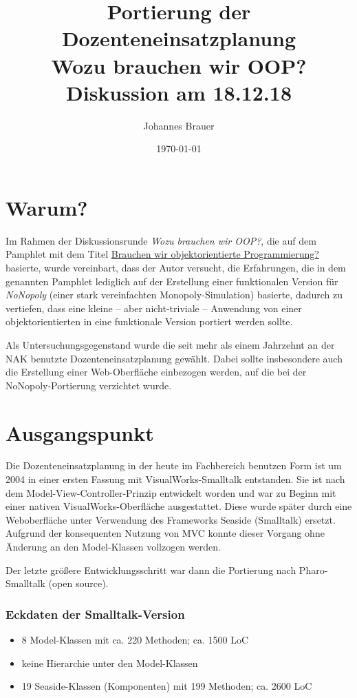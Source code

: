 \documentclass[11pt]{article}
\author{Johannes Brauer}
\date{\today}
\title{Portierung der Dozenteneinsatzplanung\\\medskip
\large Wozu brauchen wir OOP? Diskussion am 18.12.18}
\begin{document}
\maketitle
\section*{Warum?}
\label{sec:org979a519}
Im Rahmen der Diskussionsrunde \emph{Wozu brauchen wir OOP?}, die auf dem
Pamphlet mit dem Titel \href{https://www.dropbox.com/s/36vsbdk1bn4w17o/oop-wozu.pdf?dl=0}{Brauchen wir objektorientierte Programmierung?}
basierte, wurde vereinbart, dass der Autor versucht, die Erfahrungen, die in
dem genannten Pamphlet lediglich auf der Erstellung einer funktionalen
Version für \emph{NoNopoly} (einer stark vereinfachten Monopoly-Simulation)
basierte, dadurch zu vertiefen, dass eine kleine -- aber
nicht-triviale -- Anwendung von einer objektorientierten in
eine funktionale Version portiert werden sollte.

Als Untersuchungsgegenstand wurde die seit mehr als einem Jahrzehnt an
der NAK benutzte Dozenteneinsatzplanung gewählt. Dabei sollte
insbesondere auch die Erstellung einer Web-Oberfläche einbezogen
werden, auf die bei der NoNopoly-Portierung verzichtet wurde.
\section*{Ausgangspunkt}
\label{sec:orge7ee835}
Die Dozenteneinsatzplanung in der heute im Fachbereich benutzen Form
ist um 2004 in einer ersten Fassung mit VisualWorks-Smalltalk
entstanden. Sie ist nach dem Model-View-Controller-Prinzip entwickelt
worden und war zu Beginn mit einer nativen VisualWorks-Oberfläche
ausgestattet. Diese wurde später durch eine Weboberfläche unter
Verwendung des Frameworks Seaside (Smalltalk) ersetzt. Aufgrund
der konsequenten Nutzung von MVC konnte dieser Vorgang ohne Änderung
an den Model-Klassen vollzogen werden.

Der letzte größere Entwicklungsschritt war dann die Portierung nach
Pharo-Smalltalk (open source).
\subsubsection*{Eckdaten der Smalltalk-Version}
\label{sec:orgb27fc60}
\begin{itemize}
\item 8 Model-Klassen mit ca. 220 Methoden; ca. 1500 LoC
\item keine Hierarchie unter den Model-Klassen
\item 19 Seaside-Klassen (Komponenten) mit 199 Methoden; ca. 2600 LoC
\end{itemize}
\end{document}
